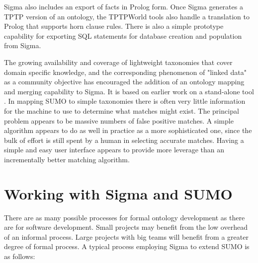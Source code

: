 \documentclass{book}
\begin{document}
Sigma also includes an export of facts in Prolog form.  Once Sigma
generates a TPTP version of an ontology, the TPTPWorld tools also handle a
translation to Prolog that supports horn clause rules. There is also a simple
prototype capability for exporting SQL statements for database creation and
population from Sigma.

The growing availability and coverage of lightweight taxonomies that cover
domain specific knowledge, and the corresponding phenomenon of "linked data" as a community objective has encouraged the addition of an
ontology mapping and merging capability to Sigma.  It is based on earlier work
on a stand-alone tool \cite{li2004lom}.  In mapping SUMO to simple taxonomies
there is often very little information for the machine to use to determine what
matches might exist. The principal problem appears to be massive numbers of
false positive matches. A simple algorithm appears to do as well in practice as
a more sophisticated one, since the bulk of effort is still spent by a human in
selecting accurate matches.  Having a simple and easy user interface appears to
provide more leverage than an incrementally better matching algorithm. 


\section{Working with Sigma and SUMO}
\label{chap:KnowEngi:sec:Work}

There are as many possible processes for formal ontology development as there
are for software development.  Small projects may benefit from the low overhead
of an informal process.  Large projects with big teams will benefit from a
greater degree of formal process.  A typical process employing Sigma to extend
SUMO is as follows:
\end{document}
